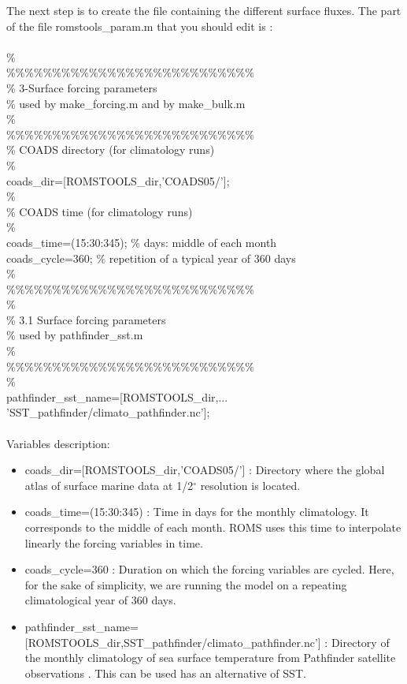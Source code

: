 The next step is to create the file containing the different surface
fluxes. The part of the file romstools\_param.m that you should edit is :
\\
\\
\%\\
\%\%\%\%\%\%\%\%\%\%\%\%\%\%\%\%\%\%\%\%\%\%\%\%\%\%\%\\
\% 3-Surface forcing parameters\\
\%   used by make\_forcing.m and by make\_bulk.m\\
\%\\
\%\%\%\%\%\%\%\%\%\%\%\%\%\%\%\%\%\%\%\%\%\%\%\%\%\%\%\\
\% COADS directory (for climatology runs)\\
\%\\
coads\_dir=[ROMSTOOLS\_dir,'COADS05/'];\\
\%\\
\% COADS time (for climatology runs)\\
\%\\
coads\_time=(15:30:345); \% days: middle of each month\\
coads\_cycle=360;        \% repetition of a typical year of 360 days \\ 
\%\\
\%\%\%\%\%\%\%\%\%\%\%\%\%\%\%\%\%\%\%\%\%\%\%\%\%\%\%\\
\%\\
\% 3.1 Surface forcing parameters\\
\%   used by pathfinder\_sst.m\\
\%\\
\%\%\%\%\%\%\%\%\%\%\%\%\%\%\%\%\%\%\%\%\%\%\%\%\%\%\%\\
\%\\
pathfinder\_sst\_name=[ROMSTOOLS\_dir,...\\
                    'SST\_pathfinder/climato\_pathfinder.nc'];\\
\\
Variables description:
\begin{itemize}
\item coads\_dir=[ROMSTOOLS\_dir,'COADS05/'] : Directory where the global atlas of surface marine 
data at 1/2$^\circ$ resolution \citep{Das94} is located.
\item coads\_time=(15:30:345) : Time in days for the monthly climatology. It corresponds to the
middle of each month. ROMS uses this time to interpolate linearly the forcing variables in time.
\item coads\_cycle=360 : Duration on which the forcing variables are cycled. Here, for the sake
of simplicity, we are running the model on a repeating climatological year of 360 days.
\item pathfinder\_sst\_name=[ROMSTOOLS\_dir,SST\_pathfinder/climato\_pathfinder.nc'] : 
Directory of the  monthly climatology of sea surface temperature from Pathfinder satellite 
observations \citep{Cas99}. This can be used has an alternative of \citet{Das94} SST.
\end{itemize}


